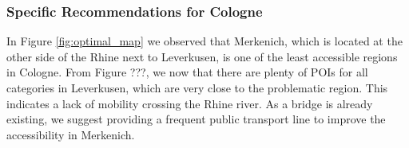 %

\subsubsection{Specific Recommendations for Cologne}

In Figure \ref{fig:optimal_map} we observed that Merkenich, which is located at the other side of the Rhine next to Leverkusen, is one of the least accessible regions in Cologne.
From Figure ???, we now that there are plenty of POIs for all categories in Leverkusen, which are very close to the problematic region.
This indicates a lack of mobility crossing the Rhine river.
As a bridge is already existing, we suggest providing a frequent public transport line to improve the accessibility in Merkenich.

